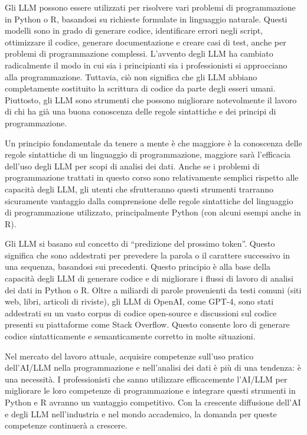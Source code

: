\documentclass[
  letterpaper,
  krantz2]{{[}./krantz{]}}
\begin{document}
Gli LLM possono essere utilizzati per risolvere vari problemi di
programmazione in Python o R, basandosi su richieste formulate in
linguaggio naturale. Questi modelli sono in grado di generare codice,
identificare errori negli script, ottimizzare il codice, generare
documentazione e creare casi di test, anche per problemi di
programmazione complessi. L'avvento degli LLM ha cambiato radicalmente
il modo in cui sia i principianti sia i professionisti si approcciano
alla programmazione. Tuttavia, ciò non significa che gli LLM abbiano
completamente sostituito la scrittura di codice da parte degli esseri
umani. Piuttosto, gli LLM sono strumenti che possono migliorare
notevolmente il lavoro di chi ha già una buona conoscenza delle regole
sintattiche e dei principi di programmazione.

Un principio fondamentale da tenere a mente è che maggiore è la
conoscenza delle regole sintattiche di un linguaggio di programmazione,
maggiore sarà l'efficacia dell'uso degli LLM per scopi di analisi dei
dati. Anche se i problemi di programmazione trattati in questo corso
sono relativamente semplici rispetto alle capacità degli LLM, gli utenti
che sfrutteranno questi strumenti trarranno sicuramente vantaggio dalla
comprensione delle regole sintattiche del linguaggio di programmazione
utilizzato, principalmente Python (con alcuni esempi anche in R).

Gli LLM si basano sul concetto di ``predizione del prossimo token''.
Questo significa che sono addestrati per prevedere la parola o il
carattere successivo in una sequenza, basandosi sui precedenti. Questo
principio è alla base della capacità degli LLM di generare codice e di
migliorare i flussi di lavoro di analisi dei dati in Python o R. Oltre a
miliardi di parole provenienti da testi comuni (siti web, libri,
articoli di riviste), gli LLM di OpenAI, come GPT-4, sono stati
addestrati su un vasto corpus di codice open-source e discussioni sul
codice presenti su piattaforme come Stack Overflow. Questo consente loro
di generare codice sintatticamente e semanticamente corretto in molte
situazioni.

Nel mercato del lavoro attuale, acquisire competenze sull'uso pratico
dell'AI/LLM nella programmazione e nell'analisi dei dati è più di una
tendenza: è una necessità. I professionisti che sanno utilizzare
efficacemente l'AI/LLM per migliorare le loro competenze di
programmazione e integrare questi strumenti in Python e R avranno un
vantaggio competitivo. Con la crescente diffusione dell'AI e degli LLM
nell'industria e nel mondo accademico, la domanda per queste competenze
continuerà a crescere.
\end{document}
